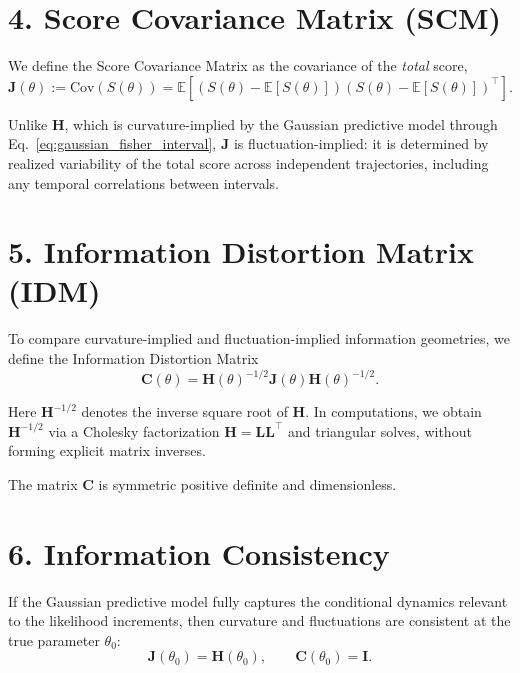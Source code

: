 \documentclass[11pt]{article}
\begin{document}
\section*{4. Score Covariance Matrix (SCM)}

We define the Score Covariance Matrix as the covariance of the \emph{total} score,
\begin{equation}
\mathbf J(\theta)
:=
\mathrm{Cov}\!\left( S(\theta) \right)
=
\mathbb{E}\!\left[
\left(S(\theta) - \mathbb{E}[S(\theta)]\right)
\left(S(\theta) - \mathbb{E}[S(\theta)]\right)^{\!\top}
\right].
\end{equation}

Unlike $\mathbf H$, which is curvature-implied by the Gaussian predictive model through
Eq.~\eqref{eq:gaussian_fisher_interval}, $\mathbf J$ is fluctuation-implied: it is determined by realized variability of the
total score across independent trajectories, including any temporal correlations between intervals.

\section*{5. Information Distortion Matrix (IDM)}

To compare curvature-implied and fluctuation-implied information geometries, we define the
Information Distortion Matrix
\begin{equation}
\mathbf C(\theta)
=
\mathbf H(\theta)^{-1/2}
\mathbf J(\theta)
\mathbf H(\theta)^{-1/2}.
\end{equation}

Here $\mathbf H^{-1/2}$ denotes the inverse square root of $\mathbf H$.
In computations, we obtain $\mathbf H^{-1/2}$ via a Cholesky factorization
$\mathbf H = \mathbf L\mathbf L^\top$ and triangular solves, without forming explicit matrix inverses.

The matrix $\mathbf C$ is symmetric positive definite and dimensionless.

\section*{6. Information Consistency}

If the Gaussian predictive model fully captures the conditional dynamics relevant to the likelihood increments,
then curvature and fluctuations are consistent at the true parameter $\theta_0$:
\begin{equation}
\mathbf J(\theta_0) = \mathbf H(\theta_0),
\qquad
\mathbf C(\theta_0) = \mathbf I.
\end{equation}
\end{document}
